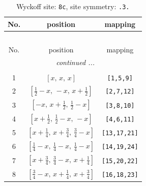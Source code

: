 \documentclass[fleqn,8pt]{jsarticle}
\begin{document}
\renewcommand{\arraystretch}{1.2}
\begin{longtable}{ccc}
\caption{Wyckoff site: {\tt 8c}, site symmetry: {\tt .3.}}
 \\
 \hline \hline
No. & position & mapping \\ \hline \endfirsthead

\multicolumn{2}{l}{\tablename\ \thetable{}} \\
 \hline \hline
No. & position & mapping \\ \hline \endhead

 \hline \hline
\multicolumn{2}{r}{\footnotesize\it continued ...} \\ \endfoot

 \hline \hline
\multicolumn{2}{r}{} \\ \endlastfoot

1 & $\left[ x,\, x,\, x \right]$ & {\tt [1,5,9]} \\ \hline
2 & $\left[ \frac{1}{2} - x,\, - x,\, x + \frac{1}{2} \right]$ & {\tt [2,7,12]} \\ \hline
3 & $\left[ - x,\, x + \frac{1}{2},\, \frac{1}{2} - x \right]$ & {\tt [3,8,10]} \\ \hline
4 & $\left[ x + \frac{1}{2},\, \frac{1}{2} - x,\, - x \right]$ & {\tt [4,6,11]} \\ \hline
5 & $\left[ x + \frac{1}{4},\, x + \frac{3}{4},\, \frac{3}{4} - x \right]$ & {\tt [13,17,21]} \\ \hline
6 & $\left[ \frac{1}{4} - x,\, \frac{1}{4} - x,\, \frac{1}{4} - x \right]$ & {\tt [14,19,24]} \\ \hline
7 & $\left[ x + \frac{3}{4},\, \frac{3}{4} - x,\, x + \frac{1}{4} \right]$ & {\tt [15,20,22]} \\ \hline
8 & $\left[ \frac{3}{4} - x,\, x + \frac{1}{4},\, x + \frac{3}{4} \right]$ & {\tt [16,18,23]} \\
\end{longtable}
\renewcommand{\arraystretch}{1.2}
\end{document}
